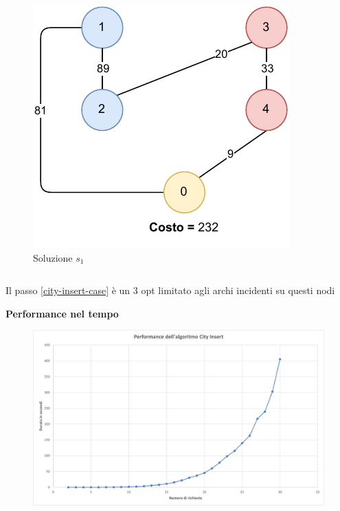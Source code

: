 \documentclass[9pt]{beamer}
\begin{document}
\begin{frame}[allowframebreaks]{\subsecname}
{\begin{columns}[T,onlytextwidth]
\begin{figure}[h]
		\includegraphics[height=0.25\textheight]
		{../images/graph-greedy-pickup-first-solution-tsppd-with-two-customers}	
		\caption{Soluzione $s_1$}
		\end{figure}
	\end{columns}

	Il passo \ref{city-insert-case} è un 3 opt limitato agli archi incidenti su questi nodi}
	
\framebreak

	\textbf{Performance nel tempo}
      	\begin{figure}[h]
	\centering
	\includegraphics[width=\textwidth]
	{../charts/09 Performance dell'algoritmo City Insert}
	\end{figure}

\end{frame}
\end{document}

